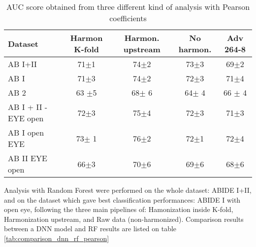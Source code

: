 \documentclass[10pt]{report}
\begin{document}
\begin{table}[!htp]\centering
\scriptsize
\begin{tabular}{lcccc}\toprule
Dataset &Harmon K-fold &Harmon. upstream &No harmon. &Adv 264-8 \\\midrule
AB I+II &71$\pm$1 &74$\pm$2 &73$\pm$3 &69$\pm$2 \\
AB I &71$\pm$3 &74$\pm$2 &72$\pm$3 &71$\pm$4 \\
AB 2 &63 $\pm$5 &68$\pm$ 6 &64$\pm$ 4 &66 $\pm$ 4 \\
AB I + II - EYE open &72$\pm$3 &75$\pm$4 &72$\pm$3 &71$\pm$3 \\
AB I open EYE &73$\pm$ 1 &76$\pm$2 &72$\pm$1 &72$\pm$4 \\
AB II EYE open &66$\pm$3 &70$\pm$6 &69$\pm$6 &68$\pm$6 \\
\bottomrule
\end{tabular}
\caption{AUC score obtained from three different kind of analysis with Pearson coefficients}
\label{tab:classification_pearson}
\end{table}


Analysis with Random Forest were performed on the whole dataset: ABIDE I+II, and on the dataset which gave best classification performances: ABIDE I with open eye, following the three main pipelines of: Hamonization inside K-fold, Harmonization upstream, and Raw data (non-harmonized).
Comparison results between a DNN model and RF results are listed on table \ref{tab:comparison_dnn_rf_pearson}
\end{document}
